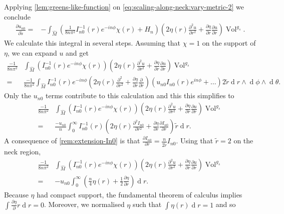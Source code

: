 \documentclass[preprint,12pt]{elsarticle}
\numberwithin{table}{section}
\newcommand{\del}{\partial}
\newcommand{\Vol}{\operatorname{Vol}}
\renewcommand{\d}{\operatorname{d}\!}
\begin{document}
Applying \cref{lem:greens-like-function} on \cref{eq:scaling-along-neck:vary-metric-2} we conclude
\begin{align}
	\frac{\del u_{n0}}{\del \tilde s} 
	=& - \int_{\hat M} \left(\frac{1}{8 n \pi^2} I_{n0}^{-1}(r) e^{- i n \phi} \chi(r) + H_n\right) \left(
		2 \eta (r)
		\frac{\del^2 u}{\del r^2}
		+\frac{\del \eta}{\del r} 
		 \frac{\del u}{\del r}
	\right) \Vol^{g_s}.
\end{align}
We calculate this integral in several steps. Assuming that $\chi = 1$ on the support of $\eta$, we can expand $u$ and get
\begin{align}
	\frac{-1}{8 n \pi^2}& \int_{\hat M} \left(I_{n0}^{-1}(r) e^{- i n \phi} \chi(r) \right) \left(
		2 \eta (r)
		\frac{\del^2 u}{\del r^2}
		+\frac{\del \eta}{\del r} 
		 \frac{\del u}{\del r}
	\right) \Vol^{g_s} \\
	=& \frac{-1}{8 n \pi^2} \int_{\hat M} I_{n0}^{-1}(r) e^{- i n \phi} \left(
		2 \eta (r)
		\frac{\del^2}{\del r^2}
		+\frac{\del \eta}{\del r} 
		 \frac{\del}{\del r}
	\right) \left( u_{n0} I_{n0}(r) e^{in\phi} + \ldots\right) 2 \tilde {r} \d r \wedge \d \phi \wedge \d \theta.
\end{align}
Only the $u_{n0}$ terms contribute to this calculation and this this simplifies to
\begin{align}
	\frac{-1}{8 n \pi^2}& \int_{\hat M} \left(I_{n0}^{-1}(r) e^{- i n \phi} \chi(r) \right) \left(
		2 \eta (r)
		\frac{\del^2 u}{\del r^2}
		+\frac{\del \eta}{\del r} 
		 \frac{\del u}{\del r}
	\right) \Vol^{g_s} \\
	=& \frac{- u_{n0}}{n} \int_{0}^{\infty} I_{n0}^{-1}(r) \left(
		2 \eta (r)
		\frac{\del^2 I_{n0}}{\del r^2}
		+\frac{\del \eta}{\del r} 
		 \frac{\del I_{n0}}{\del r}
	\right)\tilde {r} \d r.
\end{align}
A consequence of \cref{rem:extension-In0} is that $\frac{\del I_{n0}}{\del r} =\frac{n}{2 \tilde r} I_{n0}$. Using that $\tilde r = 2$ on the neck region,
\begin{align}
	\frac{-1}{8 n \pi^2}& \int_{\hat M} \left(I_{n0}^{-1}(r) e^{- i n \phi} \chi(r) \right) \left(
		2 \eta (r)
		\frac{\del^2 u}{\del r^2}
		+\frac{\del \eta}{\del r} 
		 \frac{\del u}{\del r}
	\right) \Vol^{g_s} \\
	=& -u_{n0} \int_{0}^{\infty}  \left(
		\frac{n} {4} 
		\eta (r)
		+\frac{1} {2} \frac{\del \eta}{\del r} 
	\right) \d r.
\end{align}
Because $\eta$ had compact support, the fundamental theorem of calculus implies $\int \frac{\del \eta} \del r \d r = 0$. Moreover, we normalised $\eta$ such that $\int \eta(r) \d r =1$ and so
\end{document}
